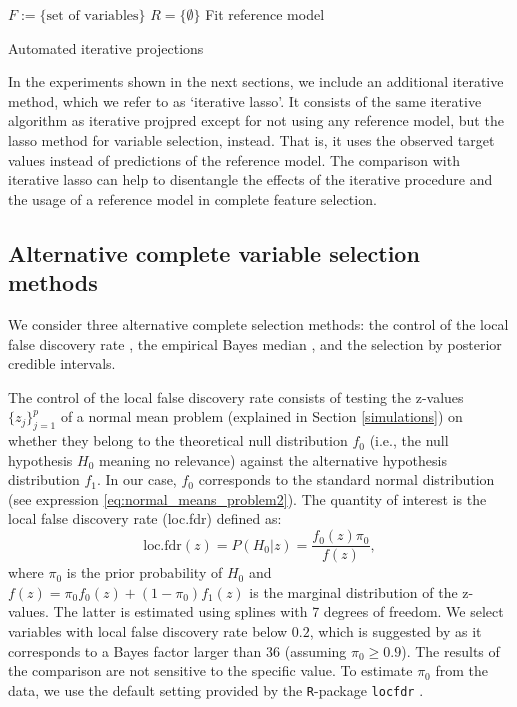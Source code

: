 \documentclass[a4]{article}
\theoremstyle{definition}
\begin{document}
\begin{center}
\begin{algorithm}[H]
\SetAlgoLined
{}
 $F:=\{\text{set of variables}\}$ \;
 $R=\{\emptyset\}$ \;
 Fit reference model\;
 \caption{Automated iterative projections}
 \label{alg:iterated_proj}
\end{algorithm}
\end{center}

In the experiments shown in the next sections, we include an additional iterative
method, which we refer to as `iterative lasso'. It consists of the same iterative
algorithm as iterative projpred except for not using any reference model, but
the lasso method for variable selection, instead.
That is, it uses the observed target values instead of predictions of the reference model.
The comparison with iterative lasso can help to disentangle the effects
of the iterative procedure and the usage of a reference model in complete feature selection.

\subsection{Alternative complete variable selection methods}

We consider three alternative complete selection methods:
 the control of the local
false discovery rate \citep{paper:efron, efron2012large}, the
empirical Bayes median \citep{johnstone2004needles}, and the selection
by posterior credible intervals.

The control of the local false discovery rate consists of testing the
z-values $\{z_{j}\}_{j=1}^{p}$ of a normal mean problem (explained in Section \ref{simulations}) 
on whether they belong to the
theoretical null distribution $f_{0}$ (i.e., the null hypothesis $H_0$
meaning no relevance) against the alternative hypothesis distribution
$f_{1}$. In our case, $f_{0}$ corresponds to the standard normal
distribution (see expression \eqref{eq:normal_means_problem2}). The
quantity of interest is the local false discovery rate (loc.fdr)
defined as: \
\begin{equation}
\text{loc.fdr}(z)=P(H_{0}|z)=\frac{f_{0}(z)\pi_{0}}{f(z)},
\end{equation}
where $\pi_{0}$ is the prior probability of $H_0$ and
$f(z)=\pi_{0}f_{0}(z)+(1-\pi_{0})f_{1}(z)$ is the marginal
distribution of the z-values. The latter is estimated using splines
with 7 degrees of freedom. We select variables with local false
discovery rate below $0.2$, which is suggested by
\citet{efron2012large} as it corresponds to a Bayes factor larger than
36 (assuming $\pi_{0}\geq0.9$). The results of the comparison are not
sensitive to the specific value. To estimate $\pi_{0}$ from the data,
we use the default setting provided by the \texttt{R}-package
\texttt{locfdr} \citep{Efron+Turnbull+Narasimhan:2015:locfdr}.
\end{document}

